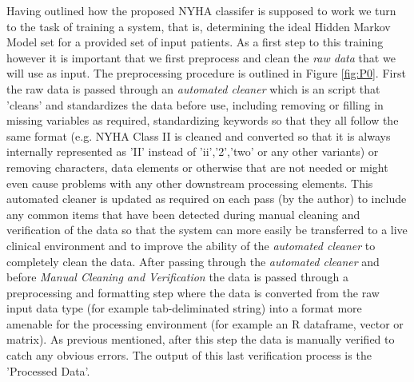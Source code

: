 \documentclass[]{article}
\begin{document}
Having outlined how the proposed NYHA classifer is supposed to work we turn to the task of training a system, that is, determining the ideal Hidden Markov Model set for a provided set of input patients. As a first step to this training however it is important that we first preprocess and clean the \textit{raw data} that we will use as input. The preprocessing procedure is outlined in Figure \ref{fig:P0}. First the raw data is passed through an \textit{automated cleaner} which is an script that 'cleans' and standardizes the data before use, including removing or filling in missing variables as required, standardizing keywords so that they all follow the same format (e.g. NYHA Class II is cleaned and converted so that it is always internally represented as 'II' instead of 'ii','2','two' or any other variants) or removing characters, data elements or otherwise that are not needed or might even cause problems with any other downstream processing elements. This automated cleaner is updated as required on each pass (by the author) to include any common items that have been detected during manual cleaning and verification of the data so that the system can more easily be transferred to a live clinical environment and to improve the ability of the \textit{automated cleaner} to completely clean the data. After passing through the \textit{automated cleaner} and before \textit{Manual Cleaning and Verification} the data is passed through a preprocessing and formatting step where the data is converted from the raw input data type (for example tab-deliminated string) into a format more amenable for the processing environment (for example an R dataframe, vector or matrix). As previous mentioned, after this step the data is manually verified to catch any obvious errors. The output of this last verification process is the 'Processed Data'.
\end{document}
